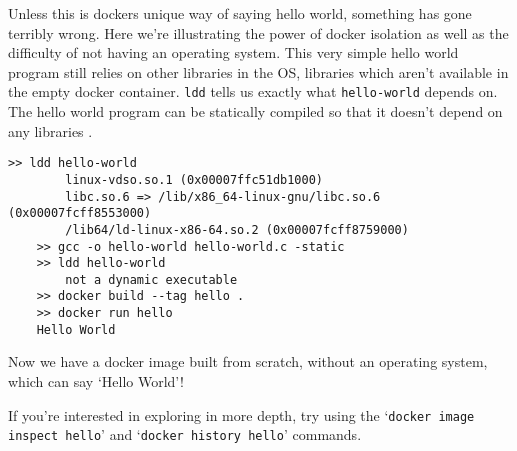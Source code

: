 Unless this is dockers unique way of saying hello world, something has gone terribly wrong.
Here we're illustrating the power of docker isolation as well as the difficulty of not having an operating system.
This very simple hello world program still relies on other libraries in the OS, libraries which aren't available in the empty docker container.
\texttt{ldd} tells us exactly what \texttt{hello-world} depends on.
The hello world program can be statically compiled so that it doesn't depend on any libraries \cite{static-hello-world}.

\begin{shaded*}
\begin{lstlisting}[language=shell]
    >> ldd hello-world
        linux-vdso.so.1 (0x00007ffc51db1000)
        libc.so.6 => /lib/x86_64-linux-gnu/libc.so.6 (0x00007fcff8553000)
        /lib64/ld-linux-x86-64.so.2 (0x00007fcff8759000)
    >> gcc -o hello-world hello-world.c -static
    >> ldd hello-world
        not a dynamic executable
    >> docker build --tag hello .
    >> docker run hello
    Hello World
\end{lstlisting}
\end{shaded*}

Now we have a docker image built from scratch, without an operating system, which can say `Hello World'!
\begin{extra}
If you're interested in exploring in more depth, try using the `\texttt{docker image inspect hello}'
and `\texttt{docker history hello}' commands.
\end{extra}




